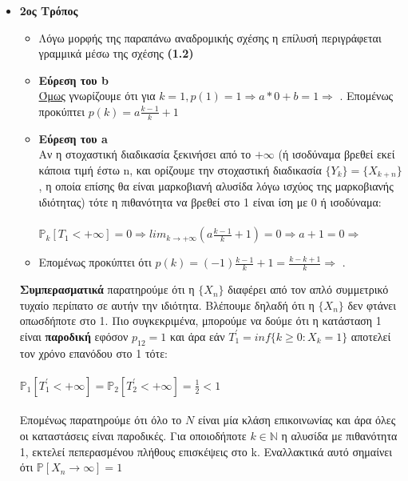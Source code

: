 \documentclass[a4paper,oneside, 11pt]{article}
\begin{document}
\begin{itemize}
	
	
	\item \textbf{2ος Τρόπος}
	\begin{itemize}
		\item Λόγω μορφής της παραπάνω αναδρομικής σχέσης η επίλυσή περιγράφεται γραμμικά μέσω της σχέσης  \textbf{(1.2)}
		\item \textbf{Εύρεση του b}\\
		\underline{Όμως} γνωρίζουμε ότι για $k = 1, p(1) = 1\Rightarrow a*0 + b = 1 \Rightarrow$ . Επομένως προκύπτει $p(k) = a \frac{k - 1}{k} + 1$
		\item  \textbf{Εύρεση του a}\\
		Αν η στοχαστική διαδικασία ξεκινήσει από το $+ \infty$ (ή ισοδύναμα βρεθεί εκεί κάποια τιμή έστω n, και ορίζουμε την στοχαστική διαδικασία $\{Y_k\} = \{X_{k+n} \}$, η οποία επίσης θα είναι μαρκοβιανή αλυσίδα λόγω ισχύος της μαρκοβιανής ιδιότητας) τότε η πιθανότητα να βρεθεί στο 1 είναι ίση με 0 ή ισοδύναμα:\\ \\
		$\mathbb{P}_k[ T_1 < + \infty] = 0 \Rightarrow lim_{k \rightarrow + \infty}(a \frac{k - 1}{k} + 1) = 0 \Rightarrow a + 1 = 0 \Rightarrow$ 
		
		\item Επομένως προκύπτει ότι $p(k) = (-1)\frac{k - 1}{k} + 1 = \frac{k - k + 1}{k} \Rightarrow$  . 
		
	\end{itemize}
	
	
	\textbf{Συμπερασματικά} παρατηρούμε ότι η $\{X_n\}$ διαφέρει από τον απλό συμμετρικό τυχαίο περίπατο σε αυτήν την ιδιότητα. Βλέπουμε δηλαδή ότι η $\{ X_n\}$ δεν φτάνει οπωσδήποτε στο 1. Πιο συγκεκριμένα, μπορούμε να δούμε ότι η κατάσταση 1 είναι \textbf{παροδική} εφόσον $p_{12} = 1$ και άρα εάν $Τ^{'}_{1} = inf\{k \geq 0: X_k = 1\}$ αποτελεί τον χρόνο επανόδου στο 1 τότε: \\ \\ 
	$\mathbb{P}_1[ T_{1}^{'} < + \infty] = \mathbb{P}_2[ T_{2}^{'} < + \infty]  = \frac{1}{2} < 1$ \\ \\ 
	Επομένως παρατηρούμε ότι όλο το $\mathbb{Ν}$ είναι μία κλάση επικοινωνίας και άρα όλες οι καταστάσεις είναι παροδικές. Για οποιοδήποτε $k \in \mathbb{N}$ η αλυσίδα με πιθανότητα 1, εκτελεί πεπερασμένου πλήθους επισκέψεις στο k. Εναλλακτικά αυτό σημαίνει ότι $\mathbb{P}[X_n \rightarrow \infty] = 1$
\end{itemize}
\endgroup
\end{document}
